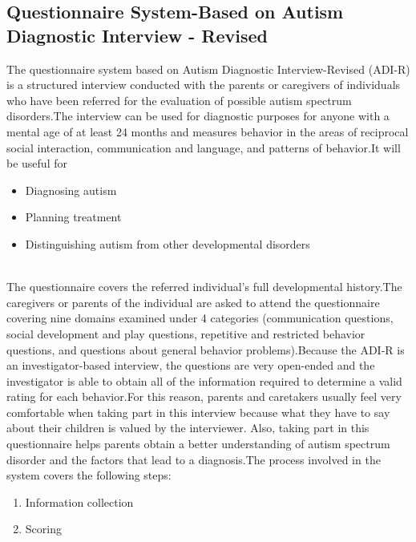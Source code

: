 \subsection{Questionnaire System-Based on Autism Diagnostic Interview - Revised}
The questionnaire system based on Autism Diagnostic Interview-Revised (ADI-R) is a structured interview conducted with the parents or caregivers of individuals who have been referred for the evaluation of possible  autism spectrum disorders.The interview can be used for diagnostic purposes for anyone with a mental age of at least 24 months and measures behavior in the areas of reciprocal social interaction, communication and language, and patterns of behavior.It will be useful for 
\begin{itemize}
  \item Diagnosing autism
  \item Planning treatment
  \item Distinguishing autism from other developmental disorders
  \end{itemize}
  \\The questionnaire covers the referred individual's full developmental history.The caregivers or parents of the individual are asked to attend the questionnaire covering nine domains examined under 4 categories (communication questions, social development and play questions, repetitive and restricted behavior questions, and questions about general behavior problems).Because the ADI-R is an investigator-based interview, the questions are very open-ended and the investigator is able to obtain all of the information required to determine a valid rating for each behavior.For this reason, parents and caretakers usually feel very comfortable when taking part in this interview because what they have to say about their children is valued by the interviewer. Also, taking part in this questionnaire helps parents obtain a better understanding of autism spectrum disorder and the factors that lead to a diagnosis.The process involved in the system covers the following steps:
  \begin{enumerate}
    \item Information collection
    \item Scoring
    \end{enumerate}
    
